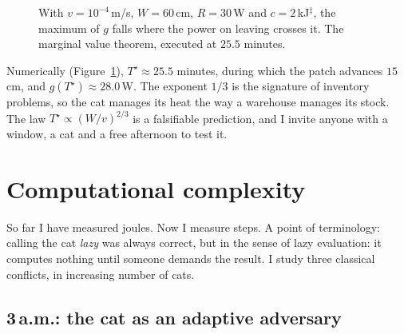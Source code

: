 \documentclass[11pt,a4paper]{article}
\theoremstyle{plain}
\theoremstyle{definition}
\theoremstyle{remark}
\numberwithin{equation}{section}
\newcommand{\calib}{{\ensuremath{^{\ddagger}}}}
\begin{document}
\begin{figure}[ht]
\centering
{}
\caption{With $v=10^{-4}$\,m/s, $W=60$\,cm, $R=30$\,W and $c=2$\,kJ\calib, the maximum of $g$ falls where the power on leaving crosses it. The marginal value theorem, executed at $25.5$ minutes.}\label{fig:sol}
\end{figure}

Numerically (Figure~\ref{fig:sol}), $T^\star\approx 25.5$ minutes, during which the patch advances $15$\,cm, and $g(T^\star)\approx 28.0$\,W. The exponent $1/3$ is the signature of inventory problems, so the cat manages its heat the way a warehouse manages its stock. The law $T^\star\propto (W/v)^{2/3}$ is a falsifiable prediction, and I invite anyone with a window, a cat and a free afternoon to test it.

\section{Computational complexity}\label{sec:computacional}

So far I have measured joules. Now I measure steps. A point of terminology: calling the cat \emph{lazy} was always correct, but in the sense of lazy evaluation: it computes nothing until someone demands the result. I study three classical conflicts, in increasing number of cats.

\subsection{3\,a.m.: the cat as an adaptive adversary}
\end{document}
